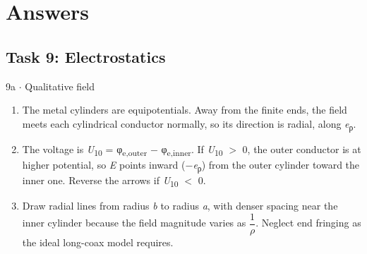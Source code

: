 \documentclass[11pt]{article}
\begin{document}
\section{Answers}
\begin{keepsection}\subsection{Task 9: Electrostatics}

\begin{workedbox}{9a \ensuremath{\cdot} Qualitative field}
\begin{enumerate}
\item The metal cylinders are equipotentials. Away from the finite ends, the field meets each cylindrical conductor normally, so its direction is radial, along \textit{e}\textsubscript{ρ}.
\item The voltage is \textit{U}\textsubscript{10} = φ\textsubscript{e,outer} \ensuremath{-} φ\textsubscript{e,inner}. If \textit{U}\textsubscript{10} \ensuremath{>} 0, the outer conductor is at higher potential, so \textit{E} points inward (\ensuremath{-}\textit{e}\textsubscript{ρ}) from the outer cylinder toward the inner one. Reverse the arrows if \textit{U}\textsubscript{10} \ensuremath{<} 0.
\item Draw radial lines from radius \textit{b} to radius \textit{a}, with denser spacing near the inner cylinder because the field magnitude varies as {\small\ensuremath{\dfrac{1}{{ρ}}}}. Neglect end fringing as the ideal long-coax model requires.
\end{enumerate}
\end{workedbox}

\end{keepsection}
\end{document}
